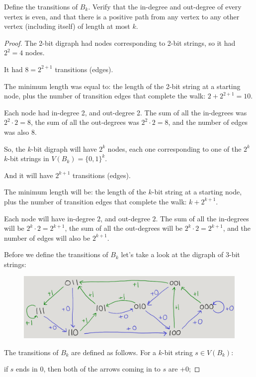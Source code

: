 \documentclass[14pt]{extarticle}
\begin{document}
Define the transitions of $B_k$. Verify that the in-degree and out-degree of every vertex is even, and that there is a positive path from any vertex to any other vertex (including itself) of length at most $k$.
\begin{proof}
The 2-bit digraph had nodes corresponding to 2-bit strings, so it had $2^{2} = 4$ nodes. 

It had $8 = 2^{2+1}$ transitions (edges).

The minimum length was equal to: the length of the 2-bit string at a starting node, plus the number of transition edges that complete the walk: $2 + 2^{2+1} = 10$.

Each node had in-degree 2, and out-degree 2. The sum of all the in-degrees was $2^{2} \cdot 2 = 8$, the sum of all the out-degrees was $2^{2} \cdot 2 = 8$, and the number of edges was also 8.

So, the $k$-bit digraph will have $2^k$ nodes, each one corresponding to one of the $2^k$ $k$-bit strings in $V(B_k) = \{0,1\}^k$. 

And it will have $2^{k+1}$ transitions (edges).

The minimum length will be: the length of the $k$-bit string at a starting node, plus the number of transition edges that complete the walk: $k + 2^{k+1}$.

Each node will have in-degree $2$, and out-degree $2$. The sum of all the in-degrees will be $2^{k} \cdot 2 = 2^{k+1}$, the sum of all the out-degrees will be $2^{k} \cdot 2 = 2^{k+1}$, and the number of edges will also be $2^{k+1}$.

Before we define the transitions of $B_k$ let's take a look at the digraph of 3-bit strings:

\begin{figure}[ht!]
\centering
\includegraphics[scale=0.35]{3-bit-digraph.png}
\end{figure}

The transitions of $B_k$ are defined as follows. For a $k$-bit string $s \in V(B_k)$:

if $s$ ends in 0, then both of the arrows coming in to $s$ are +0;


\end{proof}
\end{document}
